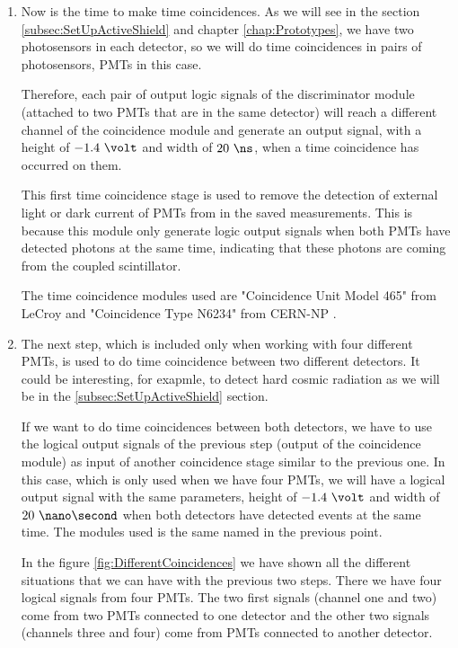 \begin{itemize}
\begin{enumerate}
\item{} Now is the time to make time coincidences. As we will see in the section \ref{subsec:SetUpActiveShield} and chapter \ref{chap:Prototypes}, we have two photosensors in each detector, so we will do time coincidences in pairs of photosensors, PMTs in this case.

Therefore, each pair of output logic signals of the discriminator module (attached to two PMTs that are in the same detector) will reach a different channel of the coincidence module and generate an output signal, with a height of $-1.4~\volt$ and width of $20~\ns$, when a time coincidence has occurred on them.

This first time coincidence stage is used to remove the detection of  external light or dark current of PMTs from  in the saved measurements. This is because this module only generate logic output signals when both PMTs have detected photons at the same time, indicating that these photons are coming from the coupled scintillator.

The time coincidence modules used are "Coincidence Unit Model 465" from LeCroy \cite{DataSheetCoincidenceLeCroy} and "Coincidence Type N6234" from CERN-NP \cite{DataSheetCoincidenceCERN}.

\item{} The next step, which is included only when working with four different PMTs, is used to do time coincidence between two different detectors. It could be interesting, for exapmle, to detect hard cosmic radiation as we will be in the \ref{subsec:SetUpActiveShield} section.

If we want to do time coincidences between both detectors, we have to use the logical output signals of the previous step (output of the coincidence module) as input of another coincidence stage similar to the previous one. In this case, which is only used when we have four PMTs, we will have a logical output signal with the same parameters, height of $-1.4~\volt$ and width of $20~\nano\second$ when both detectors have detected events at the same time. The modules used is the same named in the previous point.

In the figure \ref{fig:DifferentCoincidences} we have shown all the different situations that we can have with the previous two steps. There we have four logical signals from four PMTs. The two first signals (channel one and two) come from two PMTs connected to one detector and the other two signals (channels three and four) come from PMTs connected to another detector.


\end{enumerate}
\end{itemize}
